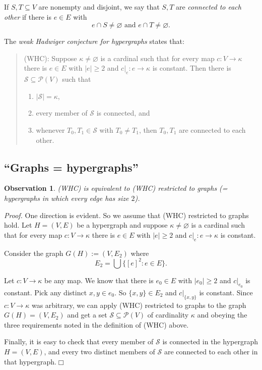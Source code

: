 \documentclass[12pt, a4paper]{amsart}
\newtheorem{observation}[lemma]{\bf Observation}
\let\cal\mathcal
\let\emptyset\varnothing
\begin{document}
If $S, T\subseteq V$ are nonempty and disjoint, we say that $S, T$ are
{\em connected to each other} if there is $e\in E$ with $$e\cap S \neq \emptyset
\text{ and } e\cap T \neq \emptyset.$$

The {\sl
weak Hadwiger conjecture for hypergraphs} states that:
\begin{quote}
	(WHC): Suppose $\kappa\neq\emptyset$ is a cardinal such that for every map $c:V\to\kappa$
	there is $e\in E$ with $|e|\geq 2$ and $c|_e:e\to \kappa$ is constant. Then
	there is ${\cal S}\subseteq {\cal P}(V)$ such that 
        \begin{enumerate}
		\item $|{\cal S}| =\kappa$,
		\item every member of ${\cal S}$ is connected, and
		\item whenever $T_0, T_1\in {\cal S}$ with $T_0\neq T_1$, then
			$T_0, T_1$ are connected to each other.
	\end{enumerate}
\end{quote}
\subsection{``Graphs = hypergraphs''}

\begin{observation} {\em
	(WHC) is equivalent to (WHC) restricted to graphs (= hypergraphs
	in which every edge has size $2$).}
\end{observation}
{\em Proof.} One direction is evident. So we assume that (WHC) restricted to graphs hold.
Let $H=(V, E)$ be a hypergraph and 
	suppose $\kappa\neq\emptyset$ is a cardinal such that for every map $c:V\to\kappa$
	there is $e\in E$ with $|e|\geq 2$ and $c|_e:e\to \kappa$ is constant.
	
Consider the graph $G(H) :=(V, E_2)$ where $$E_2 = \bigcup \{[e]^2: e\in E\}.$$

Let $c:V\to \kappa$ be any map. We know that there is $e_0\in E$ with $|e_0|\geq 2$ and 
$c|_{e_0}$ is constant. Pick any distinct $x,y\in e_0$. So $\{x,y\}\in E_2$ and $c|_{\{x,y\}}$
is constant. Since $c: V\to \kappa$ was arbitrary, we can apply (WHC) restricted to graphs
to the graph $G(H) = (V, E_2)$ and get a set ${\cal S}\subseteq {\cal P}(V)$ of cardinality
$\kappa$ and obeying the three requirements noted in the definition of (WHC) above.

Finally, it is easy to check that every member of ${\cal S}$ is connected in the hypergraph
$H=(V, E)$, and every two distinct members of ${\cal S}$ are connected to each other in that 
hypergraph.\hfill{$\Box$}
\end{document}
